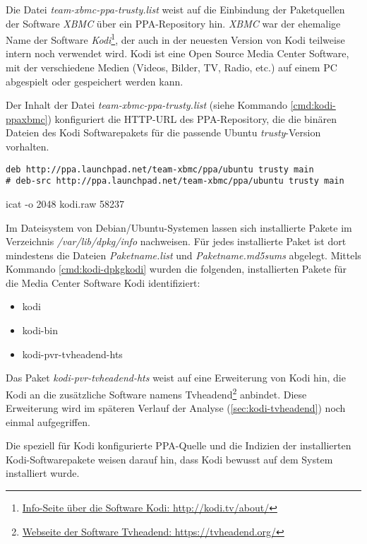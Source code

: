 Die Datei \textit{team-xbmc-ppa-trusty.list} weist auf die Einbindung der Paketquellen der Software \textit{XBMC} über ein PPA-Repository hin. \textit{XBMC} war der ehemalige Name der Software \textit{Kodi}\footnote{\href{http://kodi.tv/about/}{Info-Seite über die Software Kodi: http://kodi.tv/about/}}, der auch in der neuesten Version von Kodi teilweise intern noch verwendet wird. Kodi ist eine Open Source Media Center Software, mit der verschiedene Medien (Videos, Bilder, TV, Radio, etc.) auf einem PC abgespielt oder gespeichert werden kann.

Der Inhalt der Datei \textit{team-xbmc-ppa-trusty.list} (siehe Kommando \autoref{cmd:kodi-ppaxbmc}) konfiguriert die HTTP-URL des PPA-Repository, die die binären Dateien des Kodi Softwarepakets für die passende Ubuntu \textit{trusty}-Version vorhalten.

\begin{cmd}[H]
\begin{verbatim}
deb http://ppa.launchpad.net/team-xbmc/ppa/ubuntu trusty main
# deb-src http://ppa.launchpad.net/team-xbmc/ppa/ubuntu trusty main
\end{verbatim}
\caption{icat -o 2048 kodi.raw 58237}
\label{cmd:kodi-ppaxbmc}
\end{cmd}

Im Dateisystem von Debian/Ubuntu-Systemen lassen sich installierte Pakete im Verzeichnis \textit{/var/lib/dpkg/info} nachweisen. Für jedes installierte Paket ist dort mindestens die Dateien \textit{Paketname.list} und \textit{Paketname.md5sums} abgelegt. Mittels Kommando \autoref{cmd:kodi-dpkgkodi} wurden die folgenden, installierten Pakete für die Media Center Software Kodi identifiziert:

\begin{itemize}
\item kodi
\item kodi-bin
\item kodi-pvr-tvheadend-hts
\end{itemize}

\label{sec-kodi-tvheadend-hts}
Das Paket \textit{kodi-pvr-tvheadend-hts} weist auf eine Erweiterung von Kodi hin, die Kodi an die zusätzliche Software namens Tvheadend\footnote{\href{https://tvheadend.org/}{Webseite der Software Tvheadend: https://tvheadend.org/}} anbindet. Diese Erweiterung wird im späteren Verlauf der Analyse (\autoref{sec:kodi-tvheadend}) noch einmal aufgegriffen.

Die speziell für Kodi konfigurierte PPA-Quelle und die Indizien der installierten Kodi-Softwarepakete weisen darauf hin, dass Kodi bewusst auf dem System installiert wurde. 

